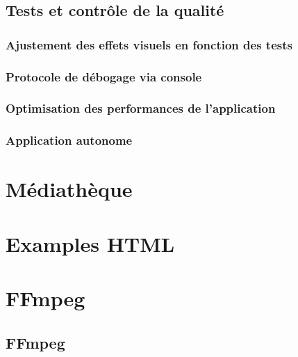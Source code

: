\documentclass[
  french,
]{book}
\begin{document}
\hypertarget{tests-et-contruxf4le-de-la-qualituxe9}{%
\section{Tests et contrôle de la qualité}\label{tests-et-contruxf4le-de-la-qualituxe9}}

\hypertarget{ajustement-des-effets-visuels-en-fonction-des-tests}{%
\subsection{Ajustement des effets visuels en fonction des tests}\label{ajustement-des-effets-visuels-en-fonction-des-tests}}

\hypertarget{protocole-de-duxe9bogage-via-console}{%
\subsection{Protocole de débogage via console}\label{protocole-de-duxe9bogage-via-console}}

\hypertarget{optimisation-des-performances-de-lapplication}{%
\subsection{Optimisation des performances de l'application}\label{optimisation-des-performances-de-lapplication}}

\hypertarget{application-autonome}{%
\subsection{Application autonome}\label{application-autonome}}

\hypertarget{muxe9diathuxe8que}{%
\chapter{Médiathèque}\label{muxe9diathuxe8que}}

\hypertarget{examples-html}{%
\chapter{Examples HTML}\label{examples-html}}

\hypertarget{ffmpeg}{%
\chapter{FFmpeg}\label{ffmpeg}}

\hypertarget{ffmpeg-1}{%
\section{FFmpeg}\label{ffmpeg-1}}
\end{document}
